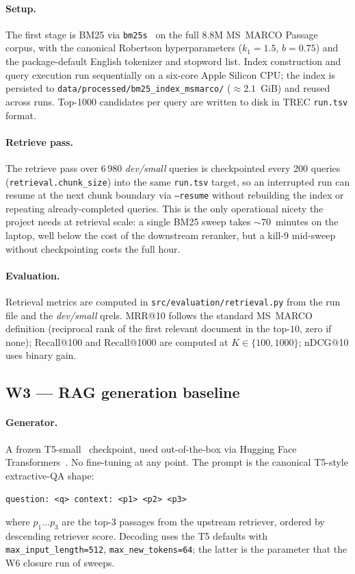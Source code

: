 \documentclass[11pt,a4paper]{article}
\makeatletter
\newcommand{\devsmall}{\textit{dev/small}}
\newcommand{\fdev}{6\,980}
\newcommand{\msmarco}{MS~MARCO}
\newcommand{\mrr}{MRR@10}
\newcommand{\ndcg}{nDCG@10}
\newcommand{\recallH}{Recall@100}
\newcommand{\recallK}{Recall@1000}
\newcommand{\bmtwofive}{BM25}
\makeatother
\begin{document}
\paragraph{Setup.}  The first stage is \bmtwofive{} via
\texttt{bm25s}~\cite{lu2024bm25s} on the full 8.8M \msmarco{}
Passage corpus, with the canonical Robertson hyperparameters
($k_1=1.5$, $b=0.75$) and the package-default English tokenizer and
stopword list.  Index construction and query execution run
sequentially on a six-core Apple Silicon CPU; the index is persisted
to \texttt{data/processed/bm25\_index\_msmarco/} ($\approx\!2.1$~GiB)
and reused across runs.  Top-1000 candidates per query are written
to disk in TREC \texttt{run.tsv} format.

\paragraph{Retrieve pass.}  The retrieve pass over \fdev{}
\devsmall{} queries is checkpointed every 200 queries
(\texttt{retrieval.chunk\_size}) into the same \texttt{run.tsv}
target, so an interrupted run can resume at the next chunk boundary
via \texttt{--resume} without rebuilding the index or repeating
already-completed queries.  This is the only operational nicety the
project needs at retrieval scale: a single \bmtwofive{} sweep takes
$\sim\!70$~minutes on the laptop, well below the cost of the
downstream reranker, but a kill-9 mid-sweep without checkpointing
costs the full hour.

\paragraph{Evaluation.}  Retrieval metrics are computed in
\texttt{src/evaluation/retrieval.py} from the run file and the
\devsmall{} qrels.  \mrr{} follows the standard \msmarco{}
definition (reciprocal rank of the first relevant document in the
top-$10$, zero if none); \recallH{} and \recallK{} are computed at
$K\!\in\!\{100,1000\}$; \ndcg{} uses binary gain.

\subsection{W3 --- RAG generation baseline}
\label{sec:w3}

\paragraph{Generator.}  A frozen T5-small~\cite{raffel2020t5}
checkpoint, used out-of-the-box via Hugging Face
Transformers~\cite{wolf2020transformers}.  No fine-tuning at any
point.  The prompt is the canonical T5-style extractive-QA shape:
\begin{center}
  \verb|question: <q> context: <p1> <p2> <p3>|
\end{center}
where $p_1\ldots p_3$ are the top-3 passages from the upstream
retriever, ordered by descending retriever score.  Decoding uses the
T5 defaults with \texttt{max\_input\_length=512},
\texttt{max\_new\_tokens=64}; the latter is the parameter that the
W6 closure run of  sweeps.
\end{document}
